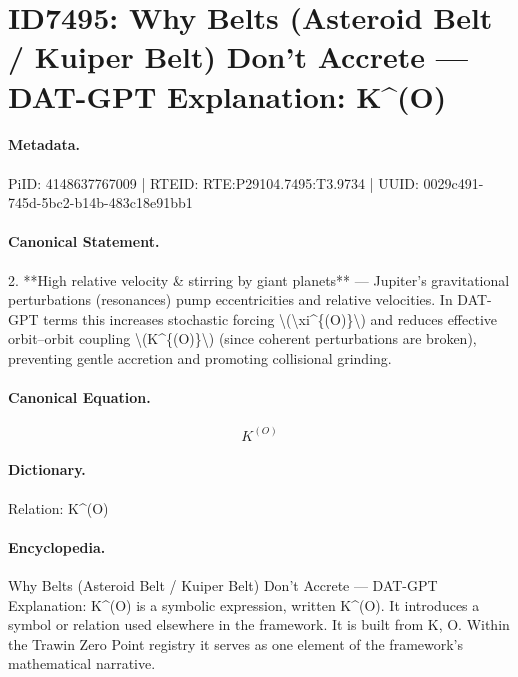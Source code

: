 \section*{ID7495: Why Belts (Asteroid Belt / Kuiper Belt) Don’t Accrete — DAT-GPT Explanation: K\textasciicircum{}(O)}
\paragraph{Metadata.}
PiID: 4148637767009 | RTEID: RTE:P29104.7495:T3.9734 | UUID: 0029c491-745d-5bc2-b14b-483c18e91bb1

\paragraph{Canonical Statement.}
2. **High relative velocity \& stirring by giant planets** — Jupiter’s gravitational perturbations (resonances) pump eccentricities and relative velocities. In DAT-GPT terms this increases stochastic forcing \textbackslash{}(\textbackslash{}xi\textasciicircum{}\{(O)\}\textbackslash{}) and reduces effective orbit–orbit coupling \textbackslash{}(K\textasciicircum{}\{(O)\}\textbackslash{}) (since coherent perturbations are broken), preventing gentle accretion and promoting collisional grinding.

\paragraph{Canonical Equation.}
\[
K^{(O)}
\]

\paragraph{Dictionary.}
Relation: K\textasciicircum{}(O)

\paragraph{Encyclopedia.}
Why Belts (Asteroid Belt / Kuiper Belt) Don’t Accrete — DAT-GPT Explanation: K\textasciicircum{}(O) is a symbolic expression, written K\textasciicircum{}(O). It introduces a symbol or relation used elsewhere in the framework. It is built from K, O. Within the Trawin Zero Point registry it serves as one element of the framework's mathematical narrative.
